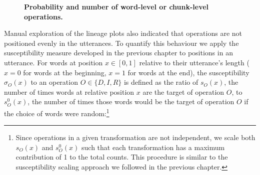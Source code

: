 \begin{figure}[!ht]
  \centering

  \caption[Probability and number of word-level or chunk-level operations]{
  \textbf{Probability and number of word-level or chunk-level operations.}
  }
  \label{fig:gistr-ops-counts}
\end{figure}

Manual exploration of the lineage plots also indicated that operations
are not positioned evenly in the utterances. To quantify this behaviour
we apply the susceptibility measure developed in the previous chapter to
positions in an utterance. For words at position \(x \in [0, 1]\)
relative to their utterance's length (\(x = 0\) for words at the
beginning, \(x = 1\) for words at the end), the susceptibility
\(\sigma_O(x)\) to an operation \(O \in \{D, I, R\}\) is defined as the
ratio of \(s_O(x)\), the number of times words at relative position
\(x\) are the target of operation \(O\), to \(s_O^0(x)\), the number of
times those words would be the target of operation \(O\) if the choice
of words were random:\footnote{Since operations in a given
  transformation are not independent, we scale both \(s_O(x)\) and
  \(s_O^0(x)\) such that each transformation has a maximum contribution
  of 1 to the total counts. This procedure is similar to the
  susceptibility scaling approach we followed in the previous chapter.}

